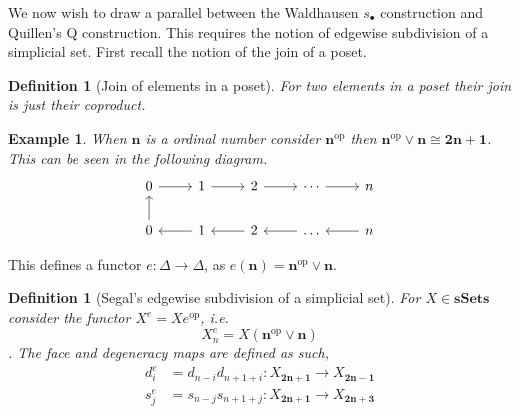 \documentclass[12pt]{report}
\numberwithin{equation}{section}
\newtheorem{definition}[dummy]{Definition}
\newtheorem{example}[dummy]{Example}
\begin{document}
	We now wish to draw a parallel between the Waldhausen \( s_\bullet \) construction and Quillen's Q construction. This requires the notion of edgewise subdivision of a simplicial set. First recall the notion of the join of a poset.
	\begin{definition}[Join of elements in a poset]
		For two elements in a poset their join is just their coproduct.
	\end{definition}
	\begin{example}
		When \( \mathbf{n} \) is a ordinal number consider \( \mathbf{n}^\mathrm{op} \) then \( \mathbf{n}^\mathrm{op} \vee \mathbf{n} \cong \mathbf{2n+1} \). This can be seen in the following diagram.
		\[\begin{tikzcd}
			0 & 1 & 2 & \cdots & n \\
			0 & 1 & 2 & \dots & n
			\arrow[from=1-1, to=1-2]
			\arrow[from=1-2, to=1-3]
			\arrow[from=1-3, to=1-4]
			\arrow[from=1-4, to=1-5]
			\arrow[from=2-1, to=1-1]
			\arrow[from=2-2, to=2-1]
			\arrow[from=2-3, to=2-2]
			\arrow[from=2-4, to=2-3]
			\arrow[from=2-5, to=2-4]
		\end{tikzcd}\]
	\end{example}
	This defines a functor \( e:\Delta \to \Delta \), as \( e(\mathbf{n}) = \mathbf{n}^\mathrm{op} \vee \mathbf{n} .\)
	
	\begin{definition}[Segal's edgewise subdivision of a simplicial set]
		For \( X \in \mathbf{sSets} \) consider the functor \( X^e=Xe^{\mathrm{op}} \), i.e. \[ X_n^e=X(\mathbf{n}^\mathrm{op} \vee \mathbf{n}) \].
		The face and degeneracy maps are defined as such,
		\begin{align*}
			d^e_i&=d_{n-i} d_{n+1+i}:X_{\mathbf{2n+1}} \to X_{\mathbf{2n-1}}\\
			s^e_j&=s_{n-j} s_{n+1+j}:X_{\mathbf{2n+1}} \to X_{\mathbf{2n+3}}	
		\end{align*}
		
	\end{definition}
	
\end{document}
